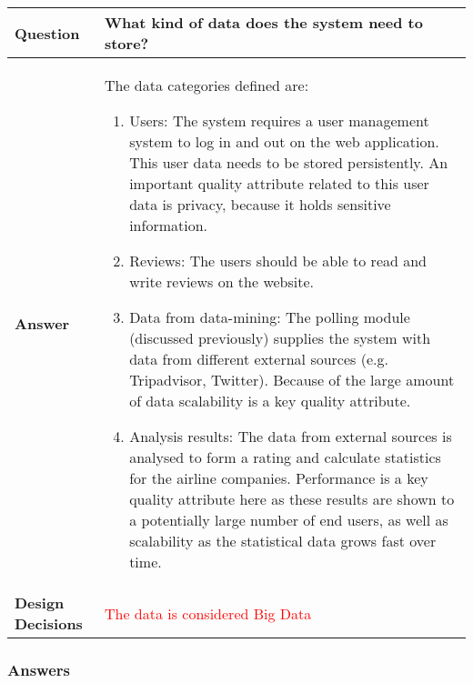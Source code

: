 \begin{longtable}{| l |  p{12cm} |}
\hline
\textbf{Question} & \textbf{What kind of data does the system need to store?}  \\ \hline
\textbf{Answer} &
The data categories defined are:
\begin{enumerate}
\item Users: The system requires a user management system to log in and out on the web application. This user data needs to be stored persistently. An important quality attribute related to this user data is privacy, because it holds sensitive information.
\item Reviews: The users should be able to read and write reviews on the website.
\item Data from data-mining: The polling module (discussed previously) supplies the system with data from different external sources (e.g. Tripadvisor, Twitter). Because of the large amount of data scalability is a key quality attribute.
\item Analysis results: The data from external sources is analysed to form a rating and calculate statistics for the airline companies. Performance is a key quality attribute here as these results are shown to a potentially large number of end users, as well as scalability as the statistical data grows fast over time.
\end{enumerate}  \\ \hline
\textbf{Design Decisions} & \textcolor{red}{The data is considered Big Data} \\ \hline
\end{longtable}


\subsubsection{Answers}

